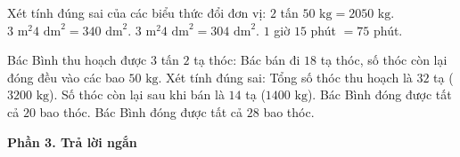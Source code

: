 \begin{ex} %
Xét tính đúng sai của các biểu thức đổi đơn vị:
\choiceTF
{\True $2$ tấn $50\text{ kg} = 2050\text{ kg}$.}
{$3\text{ m}^2 4\text{ dm}^2 = 340\text{ dm}^2$.}
{\True $3\text{ m}^2 4\text{ dm}^2 = 304\text{ dm}^2$.}
{\True $1$ giờ $15$ phút $= 75$ phút.}
\end{ex}

\begin{ex} %
Bác Bình thu hoạch được $3$ tấn $2$ tạ thóc: Bác bán đi $18$ tạ thóc, số thóc còn lại đóng đều vào các bao $50\text{ kg}$. Xét tính đúng sai:
\choiceTF
{\True Tổng số thóc thu hoạch là $32$ tạ ($3200\text{ kg}$).}
{\True Số thóc còn lại sau khi bán là $14$ tạ ($1400\text{ kg}$).}
{Bác Bình đóng được tất cả $20$ bao thóc.}
{\True Bác Bình đóng được tất cả $28$ bao thóc.}
\end{ex}

\textbf{Phần 3. Trả lời ngắn}

